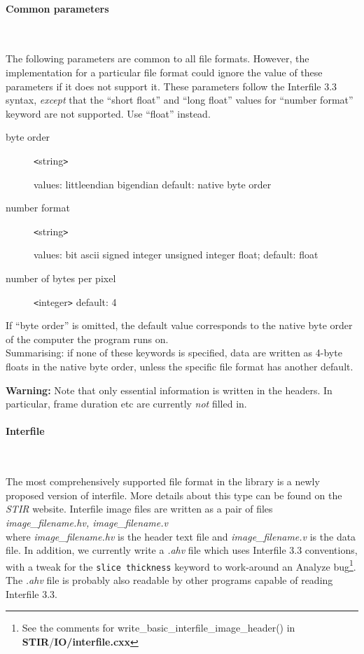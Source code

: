 \documentclass{article}
\newcommand{\subsubsubsection}[1]{\paragraph{#1}\mbox{} \\}
\begin{document}
{{{ \subsubsubsection{Common parameters}
}
\label{ref:outputcommonparameters}
The following parameters are common to all file formats. However, 
the implementation for a particular file format could ignore 
the value of these parameters if it does not support it. These 
parameters follow the Interfile 3.3 syntax, \textit{except} that the 
``short float'' and ``long float'' values for ``number format'' 
keyword are not supported. Use ``float'' instead.


\begin{description}
\item[byte order] \texttt{<}string\texttt{>}\linebreak
\raggedright
 values: littleendian {\textbar} bigendian\linebreak
 default: native byte order

\item[number format] \texttt{<}string\texttt{>}\linebreak
\raggedright
 values: bit {\textbar} ascii 
{\textbar} signed integer {\textbar} 
 unsigned integer {\textbar} float;\linebreak
default: float
\item[number of bytes per pixel] \texttt{<}integer\texttt{>}\linebreak
 default: 4
\end{description}


If ``byte order'' is omitted, the default value corresponds to 
the native byte order of the computer the program runs on.\\
Summarising: if none of these keywords is specified, data are 
written as 4-byte floats in the native byte order, unless the 
specific file format has another default.



\textbf{Warning:} Note that only essential information is written 
in the headers. In particular, frame duration etc are currently \textit{not} 
filled in.

{ \subsubsubsection{Interfile}
}
\label{sec:outputinterfile}
The most comprehensively supported file format in the library 
is a newly proposed version of interfile. More details about 
this type can be found on the \textit{STIR} website.
Interfile image files are written as a pair of files
\textit{image\_filename.hv,
image\_filename.v}\\
where \textit{image\_filename.hv} is the header text file and \textit{image\_filename.v} 
is the data file. In addition, we currently write a \textit{.ahv} 
file which uses Interfile 3.3 conventions, with a tweak for the 
\texttt{slice thickness} keyword to work-around an Analyze\texttrademark{} 
bug\footnote{See the comments for write\_basic\_interfile\_image\_header() 
in \textbf{STIR}/\textbf{IO/interfile.cxx}}. The \textit{.ahv} file is probably 
also readable by other programs capable of reading Interfile 
3.3.


}}
\end{document}
